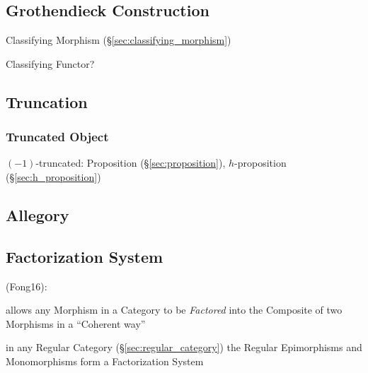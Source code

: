 \subsection{Grothendieck Construction}
\label{sec:grothendieck_construction}

Classifying Morphism (\S\ref{sec:classifying_morphism})

Classifying Functor?



\subsection{Truncation}\label{sec:truncation}

\subsubsection{Truncated Object}\label{sec:truncated_object}

$(-1)$-truncated: Proposition (\S\ref{sec:proposition}),
$h$-proposition (\S\ref{sec:h_proposition})



\subsection{Allegory}\label{sec:allegory}

\subsection{Factorization System}\label{sec:factorization_system}

(Fong16):

allows any Morphism in a Category to be \emph{Factored} into the
Composite of two Morphisms in a ``Coherent way'' %

in any Regular Category (\S\ref{sec:regular_category}) the Regular
Epimorphisms and Monomorphisms form a Factorization System



